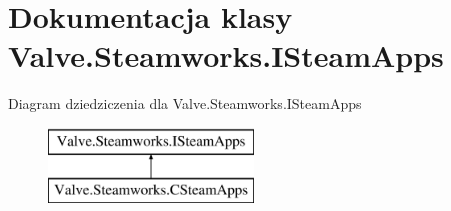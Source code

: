 \hypertarget{class_valve_1_1_steamworks_1_1_i_steam_apps}{}\section{Dokumentacja klasy Valve.\+Steamworks.\+I\+Steam\+Apps}
\label{class_valve_1_1_steamworks_1_1_i_steam_apps}
Diagram dziedziczenia dla Valve.\+Steamworks.\+I\+Steam\+Apps\begin{figure}[H]
\begin{center}
\leavevmode
\includegraphics[height=2.000000cm]{class_valve_1_1_steamworks_1_1_i_steam_apps}
\end{center}
\end{figure}
